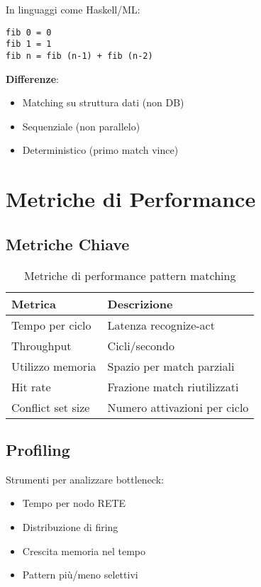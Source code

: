 In linguaggi come Haskell/ML:

\begin{verbatim}
fib 0 = 0
fib 1 = 1  
fib n = fib (n-1) + fib (n-2)
\end{verbatim}

\textbf{Differenze}:
\begin{itemize}
\item Matching su struttura dati (non DB)
\item Sequenziale (non parallelo)
\item Deterministico (primo match vince)
\end{itemize}

\section{Metriche di Performance}

\subsection{Metriche Chiave}

\begin{table}[h]
\centering
\begin{tabular}{@{}ll@{}}
\toprule
\textbf{Metrica} & \textbf{Descrizione} \\
\midrule
Tempo per ciclo & Latenza recognize-act \\
Throughput & Cicli/secondo \\
Utilizzo memoria & Spazio per match parziali \\
Hit rate & Frazione match riutilizzati \\
Conflict set size & Numero attivazioni per ciclo \\
\bottomrule
\end{tabular}
\caption{Metriche di performance pattern matching}
\end{table}

\subsection{Profiling}

Strumenti per analizzare bottleneck:
\begin{itemize}
\item Tempo per nodo RETE
\item Distribuzione di firing
\item Crescita memoria nel tempo
\item Pattern più/meno selettivi
\end{itemize}


